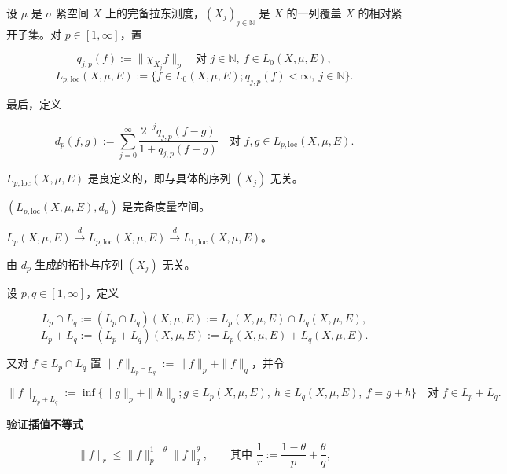 \begin{exercises}
\item

设 $ \mu $ 是 $ \sigma $ 紧空间 $ X $ 上的完备拉东测度，$ (X_j)_{j\in\mathbb{N}} $ 是 $ X $ 的一列覆盖 $ X $ 的相对紧开子集。对 $ p \in [1,\infty] $，置

\[
q_{j,p}(f) := \|\chi_{X_j} f\|_p \quad \text{对 } j \in \mathbb{N}, \ f \in L_0(X,\mu,E) ,
\]
\[
L_{p,\mathrm{loc}}(X,\mu,E) := \{ f \in L_0(X,\mu,E) ; q_{j,p}(f) < \infty, \ j \in \mathbb{N} \} .
\]

最后，定义

\[
d_p(f,g) := \sum_{j=0}^{\infty} \frac{2^{-j} q_{j,p}(f-g)}{1 + q_{j,p}(f-g)} \quad \text{对 } f,g \in L_{p,\mathrm{loc}}(X,\mu,E) .
\]

\begin{subitems}
\item

$ L_{p,\mathrm{loc}}(X,\mu,E) $ 是良定义的，即与具体的序列 $ (X_j) $ 无关。

\item

$ (L_{p,\mathrm{loc}}(X,\mu,E),d_p) $ 是完备度量空间。

\item

$ L_p(X,\mu,E) \xrightarrow{d} L_{p,\mathrm{loc}}(X,\mu,E) \xrightarrow{d} L_{1,\mathrm{loc}}(X,\mu,E) $。

\item

由 $ d_p $ 生成的拓扑与序列 $ (X_j) $ 无关。

\end{subitems}

\item

设 $ p,q \in [1,\infty] $，定义

\[
L_p \cap L_q := (L_p \cap L_q)(X,\mu,E) := L_p(X,\mu,E) \cap L_q(X,\mu,E) ,
\]
\[
L_p + L_q := (L_p + L_q)(X,\mu,E) := L_p(X,\mu,E) + L_q(X,\mu,E) .
\]

又对 $ f \in L_p \cap L_q $ 置 $ \|f\|_{L_p\cap L_q} := \|f\|_p + \|f\|_q $，并令

\[
\|f\|_{L_p+L_q} := \inf\{ \|g\|_p + \|h\|_q ; g \in L_p(X,\mu,E), \ h \in L_q(X,\mu,E), \ f = g+h \} \quad \text{对 } f \in L_p + L_q .
\]

\begin{subitems}
\item

验证\textbf{插值不等式}

\[
\|f\|_r \le \|f\|_p^{1-\theta}\|f\|_q^{\theta} , \qquad \text{其中 } \frac{1}{r} := \frac{1-\theta}{p} + \frac{\theta}{q} ,
\]


\end{subitems}
\end{exercises}
